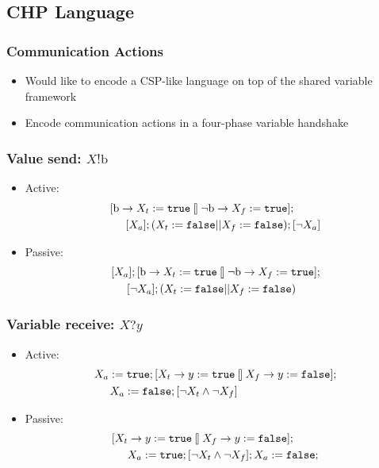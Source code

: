 \documentclass[compress]{beamer}
\begin{document}
\subsection{CHP Language}
\begin{frame}
\frametitle{Communication Actions}
\begin{itemize}
\item Would like to encode a CSP-like language on top of the shared variable framework
\pause
\item Encode communication actions in a four-phase variable handshake
\end{itemize}
\end{frame}
\begin{frame}
\frametitle{Value send: $X!\textrm{b}$}
\begin{itemize}
\item Active:
\begin{align*}
    & [\textrm{b} \rightarrow X_t := \texttt{true} \talloblong
     \lnot \textrm{b} \rightarrow X_f := \texttt{true}]; \\
    & \hspace{.5cm} [X_a]; (X_t := \texttt{false} || X_f := \texttt{false}); [\lnot X_a]
\end{align*}
\item Passive:
\begin{align*}
    & [X_a]; [\textrm{b} \rightarrow X_t := \texttt{true} \talloblong
       \lnot \textrm{b} \rightarrow X_f := \texttt{true} ]; \\
    & \hspace{.5cm} [\lnot X_a]; (X_t := \texttt{false} || X_f := \texttt{false})
\end{align*}
\end{itemize}
\end{frame}
\begin{frame}
\frametitle{Variable receive: $X?y$}
\begin{itemize}
\item Active:
\begin{align*}
    & X_a := \texttt{true};
     [X_t \rightarrow y := \texttt{true} \talloblong
      X_f \rightarrow y := \texttt{false}]; \\
    & \hspace{.5cm} X_a := \texttt{false};
      [\lnot X_t \land \lnot X_f]
\end{align*}
\item Passive:
\begin{align*}
    & [X_t \rightarrow y := \texttt{true} \talloblong
       X_f \rightarrow y := \texttt{false}]; \\
    & \hspace{.5cm} X_a := \texttt{true};
      [\lnot X_t \land \lnot X_f];
      X_a := \texttt{false};
\end{align*}
\end{itemize}
\end{frame}
\end{document}
